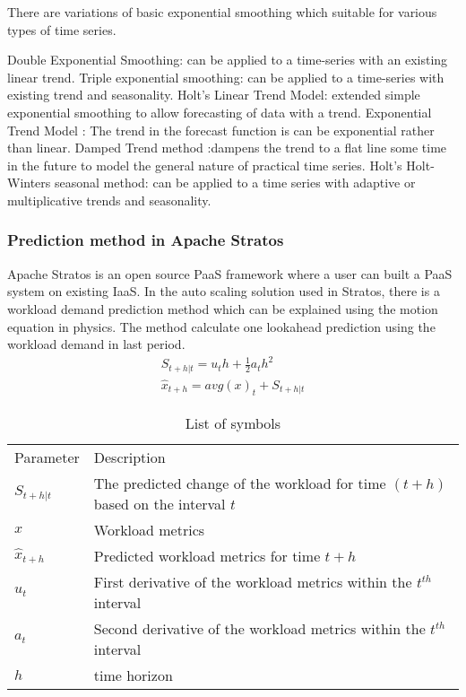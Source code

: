 There are variations of basic exponential smoothing which suitable for various types of time series.

Double Exponential Smoothing:  can be applied to a time-series with an existing linear trend.
Triple exponential smoothing:  can be applied to a time-series with existing trend and seasonality.
Holt's Linear Trend Model: extended simple exponential smoothing to allow forecasting of data with a trend.
Exponential Trend Model : The trend in the forecast function is can be exponential rather than linear.
Damped Trend method :dampens the trend to a flat line some time in the future to model the general nature of practical time series.
Holt's Holt-Winters seasonal method: can be applied to a time series with adaptive or multiplicative trends and seasonality.


\subsubsection{Prediction method in Apache Stratos}
Apache Stratos is an open source PaaS framework where a user can built a PaaS system on existing IaaS. In the auto scaling solution used in Stratos, there is a workload demand prediction method which can be explained using the motion equation in physics. The method calculate one lookahead prediction using the workload demand in last period\cite{StratosModel}.
\begin{eqnarray}
S_{t+h|t} = u_{t}h+ \frac{1}{2} a_{t}h^2 \\
\hat{x}_{t+h}=avg(x)_{t}  + S_{t+h|t} 
\end{eqnarray}

\begin{table}[]
\centering
\caption{List of symbols}
\label{my-label}
\begin{tabular}{ll}
Parameter       & Description                                                                     \\
$S_{t+h|t}$     & The predicted change of the workload for time $(t+h)$ based on the interval $t$ \\
$x$             & Workload metrics                                                                \\
$\hat{x}_{t+h}$ & Predicted workload metrics for time $t+h$                                       \\
$u_{t}$         & First derivative of the workload metrics within the $t^{th}$ interval           \\
$a_{t}$         & Second derivative of the workload metrics within the $t^{th}$ interval          \\
$h$             & time horizon                                                                   
\end{tabular}
\end{table}


